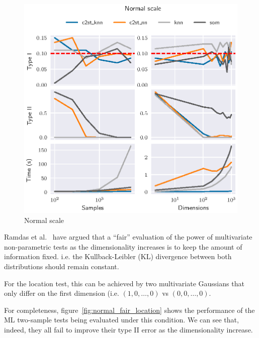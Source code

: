 \begin{figure}[htbp]
    \centering
    \includegraphics{images/4_som/normal_scale}
    \caption{Normal scale}
    \label{fig:normal_scale}
\end{figure}

Ramdas et al.~\cite{ramdas2015decreasing} have argued that a ``fair'' evaluation of the
power of multivariate non-parametric tests as the dimensionality increases is to keep the
amount of information fixed. i.e. the Kullback-Leibler (KL) divergence between both distributions
should remain constant.

For the location test, this can be achieved by two multivariate Gaussians that only differ
on the first dimension (i.e. $(1, 0, \ldots, 0)$ vs $(0, 0, \ldots, 0)$.

For completeness, figure~\ref{fig:normal_fair_location} shows the performance of the ML two-sample
tests being evaluated under this condition. We can see that, indeed, they all fail to improve
their type II error as the dimensionality increase.

